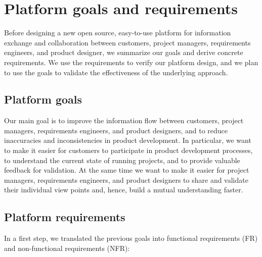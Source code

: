 \section{Platform goals and requirements}
\label{sec:requirements}

Before designing a new open source, easy-to-use platform for information exchange and collaboration between customers, project managers, requirements engineers, and product designer, we summarize our goals and derive concrete requirements.
We use the requirements to verify our platform design, and we plan to use the goals to validate the effectiveness of the underlying approach.

\subsection{Platform goals}

Our main goal is to improve the information flow between customers, project managers, requirements engineers, and product designers, and to reduce inaccuracies and inconsistencies in product development.
In particular, we want to make it easier for customers to participate in product development processes, to understand the current state of running projects, and to provide valuable feedback for validation.
At the same time we want to make it easier for project managers, requirements engineers, and product designers to share and validate their individual view points and, hence, build a mutual understanding faster.

\subsection{Platform requirements}

In a first step, we translated the previous goals into functional requirements (FR) and non-functional requirements (NFR):

